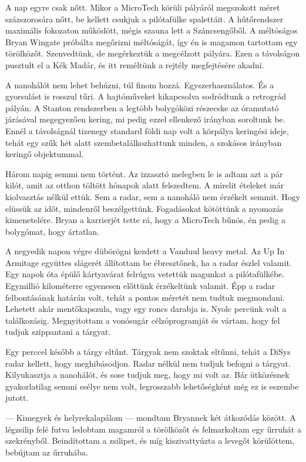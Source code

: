 \documentclass[10pt]{memoir}
\begin{document}
A nap egyre csak nőtt. Mikor a MicroTech körüli pályáról megszokott méret
százszorosára nőtt, be kellett csukjuk a pilótafülke spalettáit. A hűtőrendszer
maximális fokozaton működött, mégis szauna lett a Száncsengőből. A méltóságos
Bryan Wingate próbálta megőrizni méltóságát, így én is magamon tartottam egy
törölközőt. Szenvedtünk, de megérkeztük a megcélzott pályára. Ezen a távolságon
pusztult el a Kék Madár, és itt reméltünk a rejtély megfejtésére akadni.

A nanohálót nem lehet behúzni, túl finom hozzá. Egyszerhasználatos. És a
gyorsulást is rosszul tűri. A hajtóműveket kikapcsolva sodródtunk a retrográd
pályán. A Stanton rendszerben a legtöbb bolygóközi részecske az óramutató
járásával megegyezően kering, mi pedig ezzel ellenkező irányban soroltunk be.
Ennél a távolságnál tizenegy standard földi nap volt a körpálya keringési
ideje, tehát egy szűk hét alatt szembetalálkozhattunk minden, a szokásos
irányban keringő objektummal.

Három napig semmi nem történt. Az izzasztó melegben le is adtam azt a pár
kilót, amit az otthon töltött hónapok alatt felszedtem. A mirelit ételeket már
kiolvasztás nélkül ettük. Sem a radar, sem a nanoháló nem érzékelt semmit. Hogy
elüssük az időt, mindenről beszélgettünk. Fogadásokat kötöttünk a nyomozás
kimenetelére. Bryan a karrierjét tette rá, hogy a MicroTech bűnös, én pedig a
bolygómat, hogy ártatlan.

A negyedik napon végre dübörögni kezdett a Vanduul heavy metal. Az Up In
Armitage együttes slágerét állítottam be ébresztőnek, ha a radar észlel
valamit. Egy napok óta épülő kártyavárat felrúgva vetettük magunkat a
pilótafülkébe. Egymillió kilométerre egyenesen előttünk érzékeltünk valamit.
Épp a radar felbontásának határán volt, tehát a pontos méretét nem tudtuk
megmondani. Lehetett akár mentőkapszula, vagy egy roncs darabja is. Nyolc
percünk volt a találkozásig. Megnyitottam a vonósugár célzóprogramját és
vártam, hogy fel tudjuk szippantani a tárgyat.

Egy perccel később a tárgy eltűnt. Tárgyak nem szoktak eltűnni, tehát a DiSys
radar kellett, hogy meghibásodjon. Radar nélkül nem tudjuk befogni a tárgyat.
Kilyukasztja a nanohálót, és sose tudjuk meg, hogy mi volt az. Bár ütközésnek
gyakorlatilag semmi esélye nem volt, legrosszabb lehetőségként még ez is
eszembe jutott.

--- Kimegyek és helyrekalapálom --- mondtam Bryannek két átkozódás között. A
légzsilip felé futva ledobtam magamról a törölközőt és felmarkoltam egy űrruhát
a szekrényből. Beindítottam a zsilipet, és míg kiszivattyúzta a levegőt
körülöttem, bebújtam az űrruhába.
\end{document}
